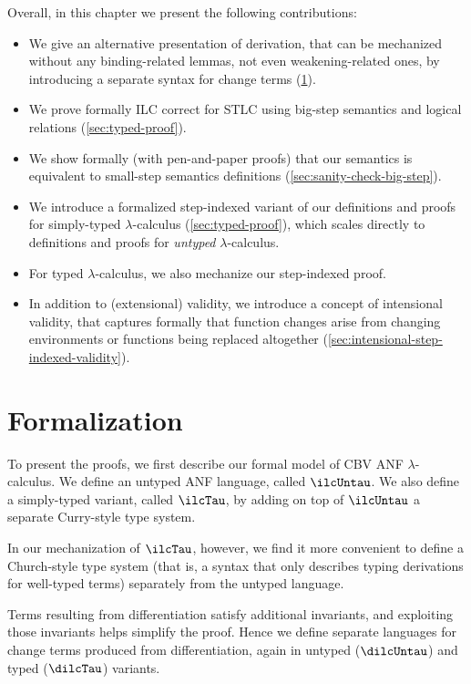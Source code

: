 Overall, in this chapter we present the following contributions:
\begin{itemize}
\item We give an alternative presentation of derivation, that can
  be mechanized without any binding-related lemmas, not even
  weakening-related ones, by introducing a separate syntax for
  change terms (\cref{sec:bsos-formalization}).
\item We prove formally ILC correct for STLC
  using big-step semantics and logical relations (\cref{sec:typed-proof}).
\item We show formally (with pen-and-paper proofs) that our
  semantics is equivalent to small-step semantics definitions
  (\cref{sec:sanity-check-big-step}).
\item We introduce a formalized step-indexed variant of our definitions and
  proofs for simply-typed $\lambda$-calculus
  (\cref{sec:typed-proof}), which scales directly to definitions
  and proofs for \emph{untyped} $\lambda$-calculus.
\item For typed $\lambda$-calculus, we also mechanize our
  step-indexed proof.
\item In addition to (extensional) validity, we introduce a
concept of intensional validity, that captures formally that
function changes arise from changing environments or functions
being replaced altogether
(\cref{sec:intensional-step-indexed-validity}).
\end{itemize}

\section{Formalization}
\label{sec:bsos-formalization}
To present the proofs, we first describe our formal model of CBV
ANF $\lambda$-calculus.
We define an untyped ANF language, called \ensuremath{\ilcUntau}.
We also define a simply-typed variant, called \ensuremath{\ilcTau}, by adding on top
of \ensuremath{\ilcUntau} a separate Curry-style type system.

In our mechanization of \ensuremath{\ilcTau}, however, we find it more
convenient to define a Church-style type system (that
is, a syntax that only describes typing derivations for
well-typed terms) separately from the untyped language.

Terms resulting from differentiation satisfy additional
invariants, and exploiting those invariants helps simplify the
proof. Hence we define separate languages for change terms
produced from differentiation, again in untyped (\ensuremath{\dilcUntau}) and
typed (\ensuremath{\dilcTau}) variants.

